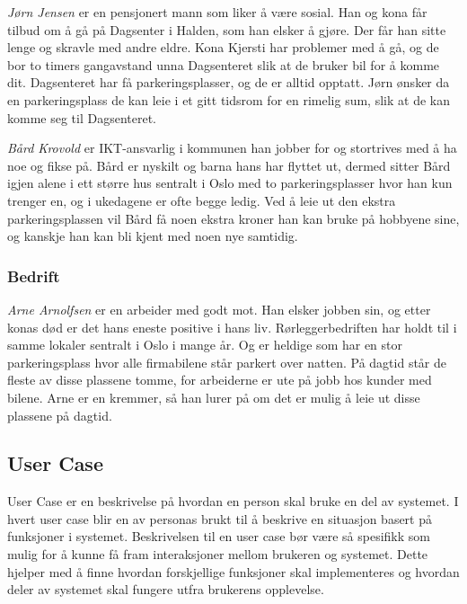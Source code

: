 \textit{Jørn Jensen} er en pensjonert mann som liker å være sosial. Han og kona får tilbud om å gå på Dagsenter i Halden, som han elsker å gjøre. Der får han sitte lenge og skravle med andre eldre. Kona Kjersti har problemer med å gå, og de bor to timers gangavstand unna Dagsenteret slik at de bruker bil for å komme dit. Dagsenteret har få parkeringsplasser, og de er alltid opptatt. Jørn ønsker da en parkeringsplass de kan leie i et gitt tidsrom for en rimelig sum, slik at de kan komme seg til Dagsenteret.



\textit{Bård Krovold} er IKT-ansvarlig i kommunen han jobber for og stortrives med å ha noe og fikse på. Bård er nyskilt og barna hans har flyttet ut, dermed sitter Bård igjen alene i ett større hus sentralt i Oslo med to parkeringsplasser hvor han kun trenger en, og i ukedagene er ofte begge ledig. Ved å leie ut den ekstra parkeringsplassen vil Bård få noen ekstra kroner han kan bruke på hobbyene sine, og kanskje han kan bli kjent med noen nye samtidig. 

\subsubsection{Bedrift}


\textit{Arne Arnolfsen} er en arbeider med godt mot. Han elsker jobben sin, og etter konas død er det hans eneste positive i hans liv. Rørleggerbedriften har holdt til i samme lokaler sentralt i Oslo i mange år. Og er heldige som har en stor parkeringsplass hvor alle firmabilene står parkert over natten. På dagtid står de fleste av disse plassene tomme, for arbeiderne er ute på jobb hos kunder med bilene. Arne er en kremmer, så han lurer på om det er mulig å leie ut disse plassene på dagtid.


\subsection{User Case}
\label{user_case}
User Case er en beskrivelse på hvordan en person skal bruke en del av systemet. I hvert user case blir en av personas brukt til å beskrive en situasjon basert på funksjoner i systemet. Beskrivelsen til en user case bør være så spesifikk som mulig for å kunne få fram interaksjoner mellom brukeren og systemet. Dette hjelper med å finne hvordan forskjellige funksjoner skal implementeres og hvordan deler av systemet skal fungere utfra brukerens opplevelse.  


